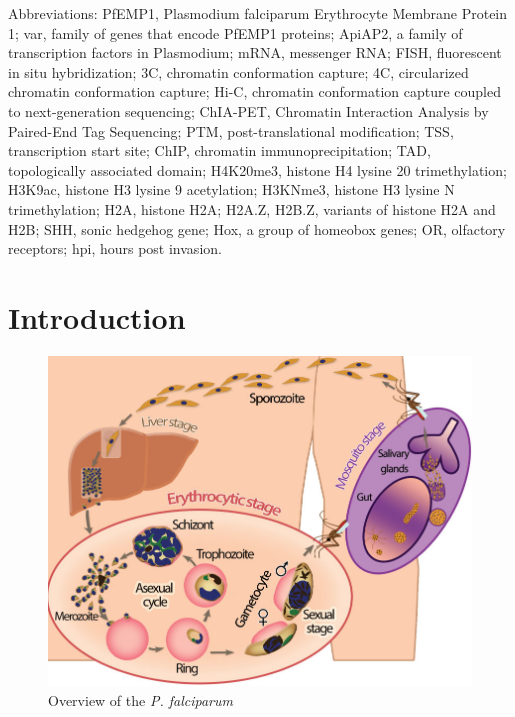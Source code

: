 Abbreviations: PfEMP1, Plasmodium falciparum Erythrocyte Membrane Protein 1;
var, family of genes that encode PfEMP1 proteins; ApiAP2, a family of
transcription factors in Plasmodium; mRNA, messenger RNA; FISH, fluorescent in
situ hybridization; 3C, chromatin conformation capture; 4C, circularized
chromatin conformation capture; Hi-C, chromatin conformation capture coupled
to next-generation sequencing; ChIA-PET, Chromatin Interaction Analysis by
Paired-End Tag Sequencing; PTM, post-translational modification; TSS,
transcription start site; ChIP, chromatin immunoprecipitation; TAD,
topologically associated domain; H4K20me3, histone H4 lysine 20
trimethylation; H3K9ac, histone H3 lysine 9 acetylation; H3K{N}me3, histone H3
lysine {N} trimethylation; H2A, histone H2A; H2A.Z, H2B.Z, variants of histone
H2A and H2B; SHH, sonic hedgehog gene; Hox, a group of homeobox genes; OR,
olfactory receptors; hpi, hours post invasion.


\section{Introduction}

\begin{figure}
\includegraphics[width=\linewidth]{figures/fig1.png}
\caption{Overview of the {\em P. falciparum}}
\label{fig:overview}
\end{figure}

